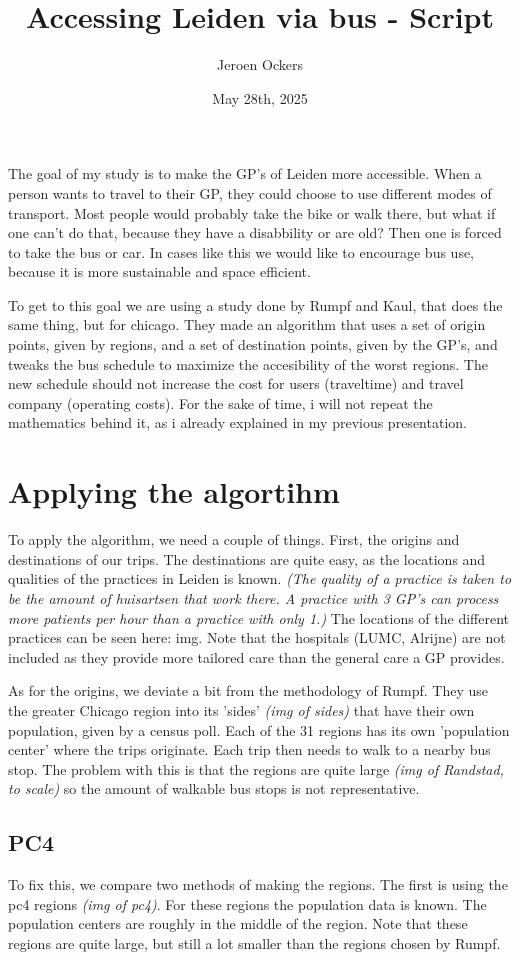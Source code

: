 \documentclass{article}
\title{Accessing Leiden via bus - Script}
\author{Jeroen Ockers}
\date{May 28th, 2025}
\begin{document}
\maketitle
The goal of my study is to make the GP's of Leiden more accessible. When a person wants to travel to their GP, they could choose to use  different modes of transport. Most people would probably take the bike or walk there, but what if one can't do that, because they have a disabbility or are old? Then one is forced to take the bus or car. In cases like this we would like to encourage bus use, because it is more sustainable and space efficient.

To get to this goal we are using a study done by Rumpf and Kaul, that does the same thing, but for chicago. They made an algorithm that uses a set of origin points, given by regions, and a set of destination points, given by the GP's, and tweaks the bus schedule to maximize the accesibility of the worst regions. The new schedule should not increase the cost for users (traveltime) and travel company (operating costs). For the sake of time, i will not repeat the mathematics behind it, as i already explained in my previous presentation.

\section{Applying the algortihm}
To apply the algorithm, we need a couple of things. First, the origins and destinations of our trips. The destinations are quite easy, as the locations and qualities of the practices in Leiden is known. \emph{(The quality of a practice is taken to be the amount of huisartsen that work there. A practice with 3 GP's can process more patients per hour than a practice with only 1.)} The locations of the different practices can be seen here: img. Note that the hospitals (LUMC, Alrijne) are not included as they provide more tailored care than the general care a GP provides. 

As for the origins, we deviate a bit from the methodology of Rumpf. They use the greater Chicago region into its 'sides' \emph{(img of sides)} that have their own population, given by a census poll. Each of the 31 regions has its own 'population center' where the trips originate. Each trip then needs to walk to a nearby bus stop. The problem with this is that the regions are quite large \emph{(img of Randstad, to scale)} so the amount of walkable bus stops is not representative.

\subsection{PC4}
To fix this, we compare two methods of making the regions. The first is using the pc4 regions \emph{(img of pc4)}. For these regions the population data is known. The population centers are roughly in the middle of the region. Note that these regions are quite large, but still a lot smaller than the regions chosen by Rumpf.
\end{document}
